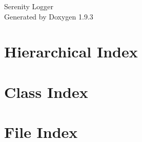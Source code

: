 \documentclass[twoside]{book}
\newcommand{\+}{\discretionary{\mbox{\scriptsize$\hookleftarrow$}}{}{}}
\newcommand{\clearemptydoublepage}{%
    \newpage{\pagestyle{empty}\cleardoublepage}%
  }
\begin{document}
  \raggedbottom
  \begin{titlepage}
  \vspace*{7cm}
  \begin{center}%
  {\Large Serenity Logger}\\
  \vspace*{1cm}
  {\large Generated by Doxygen 1.9.3}\\
  \end{center}
  \end{titlepage}
  \clearemptydoublepage
  \tableofcontents
  \clearemptydoublepage
\chapter{Hierarchical Index}

\chapter{Class Index}

\chapter{File Index}

\end{document}
